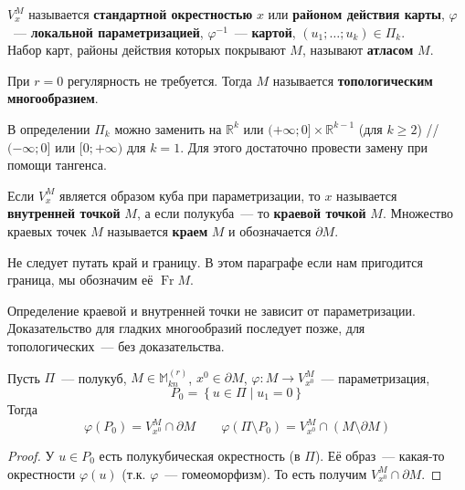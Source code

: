 \documentclass{article}
\let\tmp\varphi
\let\varphi\phi
\let\phi\tmp
\begin{document}
    \begin{definition}
        $V_x^M$ называется \textbf{стандартной окрестностью} $x$ или \textbf{районом действия карты}, $\phi$~--- \textbf{локальной параметризацией}, $\phi^{-1}$~--- \textbf{картой}, $(u_1;\ldots;u_k)\in\Pi_k$.\\
        Набор карт, районы действия которых покрывают $M$, называют \textbf{атласом} $M$.
    \end{definition}
    \begin{definition}
        При $r=0$ регулярность не требуется. Тогда $M$ называется \textbf{топологическим многообразием}.
    \end{definition}
    \begin{remark}
        В определении $\Pi_k$ можно заменить на $\mathbb R^k$ или $(+\infty;0]\times\mathbb R^{k-1}$ (для $k\geqslant2$) // $(-\infty;0]$ или $[0;+\infty)$ для $k=1$. Для этого достаточно провести замену при помощи тангенса.
    \end{remark}
    \begin{definition}
        Если $V_x^M$ является образом куба при параметризации, то $x$ называется \textbf{внутренней точкой} $M$, а если полукуба~--- то \textbf{краевой точкой} $M$. Множество краевых точек $M$ называется \textbf{краем} $M$ и обозначается $\partial M$.
    \end{definition}
    \begin{remark}
        Не следует путать край и границу. В этом параграфе если нам пригодится граница, мы обозначим её $\operatorname{Fr}M$.
    \end{remark}
    \begin{claim}
        Определение краевой и внутренней точки не зависит от параметризации.\\
        Доказательство для гладких многообразий последует позже, для топологических~--- без доказательства.
    \end{claim}
    \begin{claim}
        Пусть $\Pi$~--- полукуб, $M\in\mathbb M_{kn}^{(r)}$, $x^0\in\partial M$, $\phi\colon M\to V_{x^0}^M$~--- параметризация,
        $$
        P_0=\left\{u\in\Pi\mid u_1=0\right\}
        $$
        Тогда
        $$
        \phi(P_0)=V_{x^0}^M\cap\partial M\qquad\phi(\Pi\setminus P_0)=V_{x^0}^M\cap(M\setminus\partial M)
        $$
    \end{claim}
    \begin{proof}
        У $u\in P_0$ есть полукубическая окрестность (в $\Pi$). Её образ~--- какая-то окрестности $\phi(u)$ (т.к. $\phi$~--- гомеоморфизм). То есть получим $V_{x^0}^M\cap\partial M$.
    \end{proof}
\end{document}
